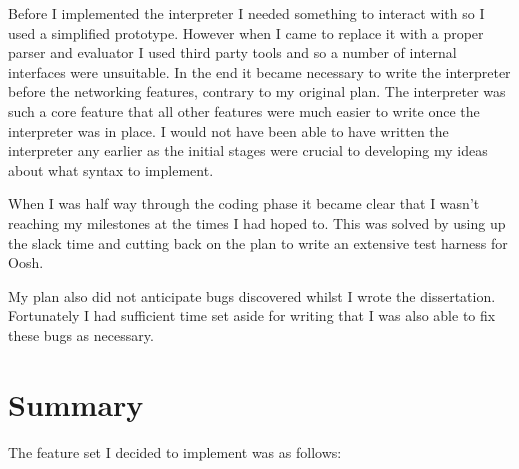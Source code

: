 \documentclass[12pt,twoside,notitlepage]{report}
\begin{document}
Before I implemented the interpreter I needed something to interact
with so I used a simplified prototype. However when I came to replace
it with a proper parser and evaluator I used third party tools and so
a number of internal interfaces were unsuitable. In the end it became
necessary to write the interpreter before the networking features,
contrary to my original plan. The interpreter was such a core feature
that all other features were much easier to write once the interpreter
was in place. I would not have been able to have written the
interpreter any earlier as the initial stages were crucial to
developing my ideas about what syntax to implement.

When I was half way through the coding phase it became clear that I
wasn't reaching my milestones at the times I had hoped to. This was
solved by using up the slack time and cutting back on the plan to
write an extensive test harness for Oosh.

My plan also did not anticipate bugs discovered whilst I wrote the
dissertation. Fortunately I had sufficient time set aside for writing
that I was also able to fix these bugs as necessary.

\section{Summary}

The feature set I decided to implement was as follows:
\end{document}
